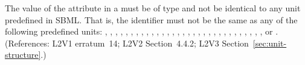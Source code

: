 The value of the  attribute in a \UnitDefinition must be of
type  and not be
identical to any unit predefined in SBML.  That is, the identifier
must not be the same as any of the following predefined units:
,
,
,
,
,
,
,
,
,
,
,
,
,
,
,
,
,
,
,
,
,
,
,
,
,
,
,
,
,
,
, or
.
(References: L2V1 erratum~14; L2V2 Section~4.4.2; L2V3
Section~\ref{sec:unit-structure}.)
